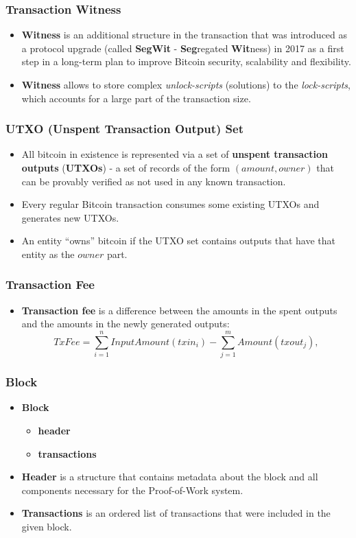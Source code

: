 \documentclass{beamer}
\begin{document}
\begin{frame}
  \frametitle{Transaction Witness}
  \begin{itemize}
  \item \textbf{Witness} is an additional structure in the transaction that was
    introduced as a protocol upgrade (called \textbf{SegWit} -
    \textbf{Seg}regated \textbf{Wit}ness) in 2017 as a first step in a long-term
    plan to improve Bitcoin security, scalability and flexibility.
  \item \textbf{Witness} allows to store complex \textit{unlock-scripts}
    (solutions) to the \textit{lock-scripts}, which accounts for a large part of
    the transaction size.
  \end{itemize}
\end{frame}

\begin{frame}
  \frametitle{UTXO (Unspent Transaction Output) Set}
  \begin{itemize}
  \item All bitcoin in existence is represented via a set of \textbf{unspent
      transaction outputs} (\textbf{UTXOs}) - a set of records of the form
    $(amount, owner)$ that can be provably verified as not used in any
    known transaction.
  \item Every regular Bitcoin transaction consumes some existing UTXOs and
    generates new UTXOs.
  \item An entity ``owns'' bitcoin if the UTXO set contains outputs that have
    that entity as the $owner$ part.
  \end{itemize}
\end{frame}

\begin{frame}[fragile]
  \frametitle{Transaction Fee}
  \begin{itemize}
  \item \textbf{Transaction fee} is a difference between the amounts in the
    spent outputs and the amounts in the newly generated outputs:
    $$TxFee = \sum_{i=1}^n InputAmount(txin_i) - \sum_{j=1}^m Amount(txout_j),$$
  \end{itemize}
\end{frame}

\begin{frame}
  \frametitle{Block}
  \begin{itemize}
  \item \textbf{Block}
    \begin{itemize}
    \item \textbf{header}
    \item \textbf{transactions}
    \end{itemize}
  \item \textbf{Header} is a structure that contains metadata about the block
    and all components necessary for the Proof-of-Work system.
  \item \textbf{Transactions} is an ordered list of transactions that were
    included in the given block.
  \end{itemize}
\end{frame}
\end{document}
